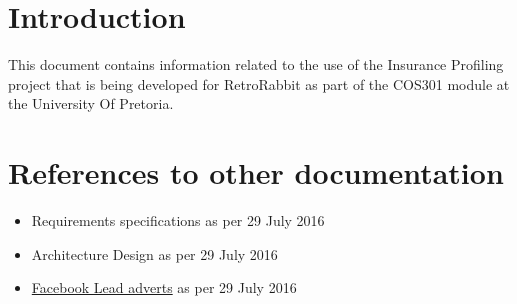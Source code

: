 \documentclass{article}
\begin{document}
	\section{Introduction}
		This document contains information related to the use of the Insurance Profiling project that is being developed for RetroRabbit as part of the COS301 module at the University Of Pretoria.

	\section{References to other documentation}
		\begin{itemize}
			\item{Requirements specifications as per 29 July 2016}
			\item{Architecture Design as per 29 July 2016}
			\item{\href{https://www.facebook.com/business/a/lead-ads}{Facebook Lead adverts} as per 29 July 2016}
		\end{itemize}
\end{document}
